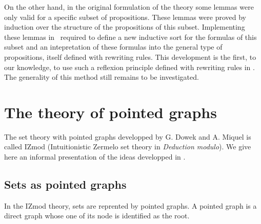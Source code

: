 \documentclass[a4paper]{article}
\begin{document}
On the other hand, in the original formulation of the theory some lemmas were only valid for a specific subset of propositions. These lemmas were proved by induction over the structure of the propositions of this subset. Implementing these lemmas in \dedukti ~required to define a new inductive sort for the formulas of this subset and an intepretation of these formulas into the general type of  propositions, itself defined with rewriting rules. This development is the first, to our knowledge, to use such a reflexion principle defined with rewriting rules in \dedukti. The generality of this method still remains to be investigated.

\section{The theory of pointed graphs}

The set theory with pointed graphs developped by G. Dowek and A. Miquel is called IZmod (Intuitionistic Zermelo set theory in \textit{Deduction modulo}). We give here an informal presentation of the ideas developped in \cite{zermodulo}.

\subsection{Sets as pointed graphs}

\label{informal}

In the IZmod theory, sets are reprented by pointed graphs. A pointed graph is a direct graph whose one of its node is identified as the root. 
\end{document}
